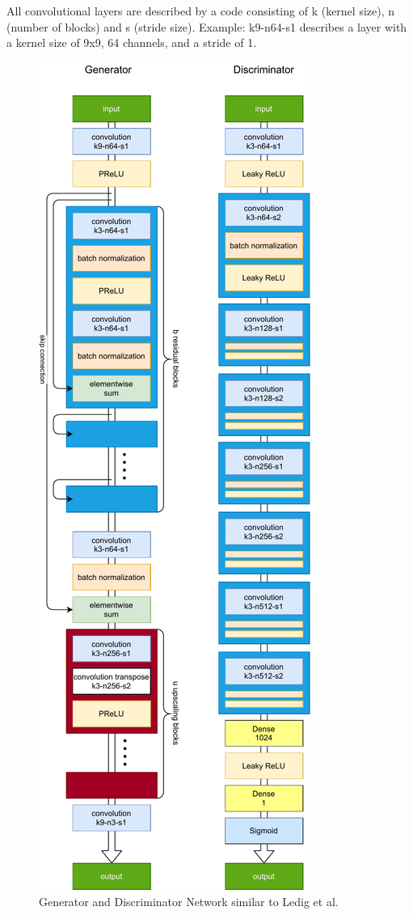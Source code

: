 \documentclass[11pt,twocolumn,twoside,paper=a4]{IEEEtran}
\begin{document}
All convolutional layers are described by a code consisting of k (kernel size), n (number of blocks) and s (stride size). Example: k9-n64-s1 describes a layer with a kernel size of 9x9, 64 channels, and a stride of 1.

\begin{center}
    \begin{figure}[h] 
        \includegraphics[scale=0.7]{../images/gen_and_dis.pdf}  
        \caption{Generator and Discriminator Network similar to Ledig et al.~\cite{DBLP:journals/corr/LedigTHCATTWS16} }   
        \label{fig:network_architecture}
    \end{figure} 
\end{center}
\end{document}
